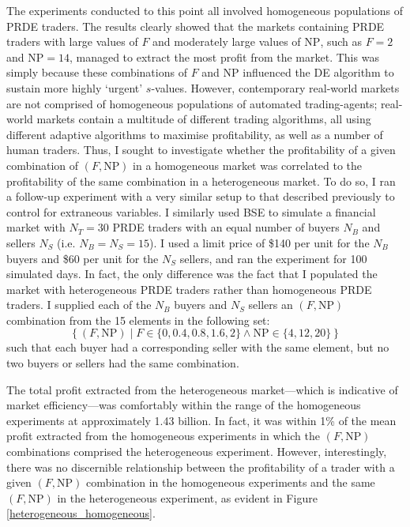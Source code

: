 \documentclass[conference]{IEEEtran}
\begin{document}
The experiments conducted to this point all involved homogeneous populations of PRDE traders.
The results clearly showed that the markets containing PRDE traders with large values of $F$ and moderately large values of $\mathrm{NP}$, such as $F=2$ and $\mathrm{NP}=14$, managed to extract the most profit from the market.
This was simply because these combinations of $F$ and $\mathrm{NP}$ influenced the DE algorithm to sustain more highly `urgent' $s$-values.
However, contemporary real-world markets are not comprised of homogeneous populations of automated trading-agents; real-world markets contain a multitude of different trading algorithms, all using different adaptive algorithms to maximise profitability, as well as a number of human traders.
Thus, I sought to investigate whether the profitability of a given combination of $(F, \mathrm{NP})$ in a homogeneous market was correlated to the profitability of the same combination in a heterogeneous market.
To do so, I ran a follow-up experiment with a very similar setup to that described previously to control for extraneous variables.
I similarly used BSE to simulate a financial market with $N_T=30$ PRDE traders with an equal number of buyers $N_B$ and sellers $N_S$ (i.e. $N_B=N_S=15$).
I used a limit price of \$140 per unit for the $N_B$ buyers and \$60 per unit for the $N_S$ sellers, and ran the experiment for 100 simulated days.
In fact, the only difference was the fact that I populated the market with heterogeneous PRDE traders rather than homogeneous PRDE traders.
I supplied each of the $N_B$ buyers and $N_S$ sellers an $(F,\mathrm{NP})$ combination from the 15 elements in the following set:
\[
  \left\{ (F, \mathrm{NP}) \mid F\in\{0, 0.4, 0.8, 1.6, 2\} \land \mathrm{NP} \in \{4, 12, 20 \} \right\}
\]
such that each buyer had a corresponding seller with the same element, but no two buyers or sellers had the same combination.

The total profit extracted from the heterogeneous market---which is indicative of market efficiency---was comfortably within the range of the homogeneous experiments at approximately 1.43 billion.
In fact, it was within 1\% of the mean profit extracted from the homogeneous experiments in which the $(F,\mathrm{NP})$ combinations comprised the heterogeneous experiment.
However, interestingly, there was no discernible relationship between the profitability of a trader with a given $(F, \mathrm{NP})$ combination in the homogeneous experiments and the same $(F, \mathrm{NP})$ in the heterogeneous experiment, as evident in Figure \ref{heterogeneous_homogeneous}.
\end{document}
